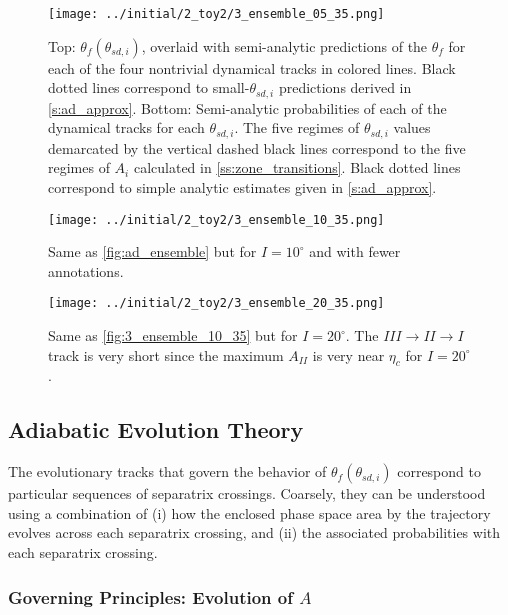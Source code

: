\documentclass[
        fleqn,
        usenatbib,
        referee,
    ]{mnras}
\newcommand*{\p}[1]{\left(#1\right)}
\begin{document}
\begin{figure}
    \centering
    \texttt{[image: ../initial/2\_toy2/3\_ensemble\_05\_35.png]}
    \caption{Top: $\theta_{f}\p{\theta_{sd, i}}$, overlaid with semi-analytic
    predictions of the $\theta_{ f}$ for each of the four nontrivial
    dynamical tracks in colored lines. Black dotted lines correspond to
    small-$\theta_{sd, i}$ predictions derived in \autoref{s:ad_approx}.
    Bottom: Semi-analytic probabilities of each of the dynamical tracks for each
    $\theta_{sd, i}$. The five regimes of $\theta_{sd, i}$ values demarcated by
    the vertical dashed black lines correspond to the five regimes of $A_i$
    calculated in \autoref{ss:zone_transitions}. Black dotted lines correspond to
    simple analytic estimates given in
    \autoref{s:ad_approx}.}\label{fig:ad_ensemble}
\end{figure}
\begin{figure}
    \centering
    \texttt{[image: ../initial/2\_toy2/3\_ensemble\_10\_35.png]}
    \caption{Same as \autoref{fig:ad_ensemble} but for $I =
    10^\circ$ and with fewer annotations.}\label{fig:3_ensemble_10_35}
\end{figure}
\begin{figure}
    \texttt{[image: ../initial/2\_toy2/3\_ensemble\_20\_35.png]}
    \caption{Same as \autoref{fig:3_ensemble_10_35} but for $I = 20^\circ$. The
    $III \to II \to I$ track is very short since the maximum $A_{II}$ is very
    near $\eta_c$ for $I = 20^\circ$.}\label{fig:3_ensemble_20_35}
\end{figure}

\subsection{Adiabatic Evolution Theory}\label{ss:zone_transitions}

The evolutionary tracks that govern the behavior of $\theta_f\p{\theta_{sd,
i}}$ correspond to particular sequences of separatrix crossings. Coarsely, they
can be understood using a combination of (i) how the enclosed phase space area
by the trajectory evolves across each separatrix crossing, and (ii) the
associated probabilities with each separatrix crossing.

\subsubsection{Governing Principles: Evolution of $A$}\label{sss:a_evo}
\end{document}
